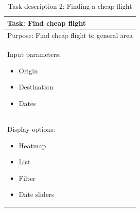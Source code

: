 \begin{table}[H]
\begin{tabular}{|p{}|}
    \hline
    \textbf{Task: Find cheap flight}\\
    \hline
    Purpose: Find cheap flight to general area\\
    \hline
    Input parameters:
    \begin{itemize}
        \item Origin
        \item Destination
        \item Dates
    \end{itemize}\\
    \hline
    Display options:
    \begin{itemize}
        \item Heatmap
        \item List
        \item Filter
        \item Date sliders
    \end{itemize}\\
    \hline
\end{tabular}
\caption*{Task description 2: Finding a cheap flight}
\end{table}

